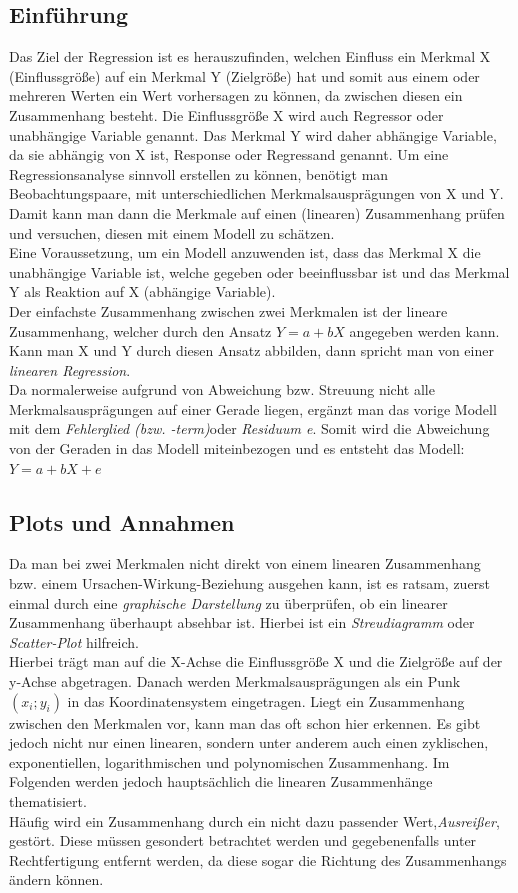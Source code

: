 \documentclass[a4paper]{article}
\begin{document}
\subsection{Einführung}
Das Ziel der Regression ist es herauszufinden, welchen Einfluss ein Merkmal X (Einflussgröße) auf ein Merkmal Y (Zielgröße) hat und somit aus einem oder mehreren Werten ein Wert vorhersagen zu können, da zwischen diesen ein Zusammenhang besteht. Die Einflussgröße X wird auch Regressor oder unabhängige Variable genannt. Das Merkmal Y wird daher abhängige Variable, da sie abhängig von X ist, Response oder Regressand genannt.
Um eine Regressionsanalyse sinnvoll erstellen zu können, benötigt man Beobachtungspaare, mit unterschiedlichen Merkmalsausprägungen von X und Y. Damit kann man dann die Merkmale auf einen (linearen) Zusammenhang prüfen und versuchen, diesen mit einem Modell zu schätzen.\\
Eine Voraussetzung, um ein Modell anzuwenden ist, dass das Merkmal X die unabhängige Variable ist, welche gegeben oder beeinflussbar ist und das Merkmal Y als Reaktion auf X (abhängige Variable).\\
Der einfachste Zusammenhang zwischen zwei Merkmalen ist der lineare Zusammenhang, welcher durch den Ansatz $Y=a+bX$ angegeben werden kann. Kann man X und Y durch diesen Ansatz abbilden, dann spricht man von einer \textit{linearen Regression}.\\
Da normalerweise aufgrund von Abweichung bzw. Streuung nicht alle Merkmalsausprägungen auf einer Gerade liegen, ergänzt man das vorige Modell mit dem \textit{Fehlerglied (bzw. -term)}oder \textit{Residuum e}. Somit wird die Abweichung von der Geraden in das Modell miteinbezogen und es entsteht das Modell: $Y=a+bX+e$

\subsection{Plots und Annahmen}
Da man bei zwei Merkmalen nicht direkt von einem linearen Zusammenhang bzw. einem Ursachen-Wirkung-Beziehung ausgehen kann, ist es ratsam, zuerst einmal durch eine \textit{graphische Darstellung} zu überprüfen, ob ein linearer Zusammenhang überhaupt absehbar ist. Hierbei ist ein \textit{Streudiagramm} oder \textit{Scatter-Plot} hilfreich.\\
Hierbei trägt man auf die X-Achse die Einflussgröße X und die Zielgröße auf der y-Achse abgetragen. Danach werden Merkmalsausprägungen als ein Punk $(x_i;y_i)$ in das Koordinatensystem eingetragen. Liegt ein Zusammenhang zwischen den Merkmalen vor, kann man das oft schon hier erkennen. Es gibt jedoch nicht nur einen linearen, sondern unter anderem auch einen zyklischen, exponentiellen, logarithmischen und polynomischen Zusammenhang. Im Folgenden werden jedoch hauptsächlich die linearen Zusammenhänge thematisiert. \\
Häufig wird ein Zusammenhang durch ein nicht dazu passender Wert,\textit{Ausreißer}, gestört. Diese müssen gesondert betrachtet werden und gegebenenfalls unter Rechtfertigung entfernt werden, da diese sogar die Richtung des Zusammenhangs ändern können. 
\end{document}

